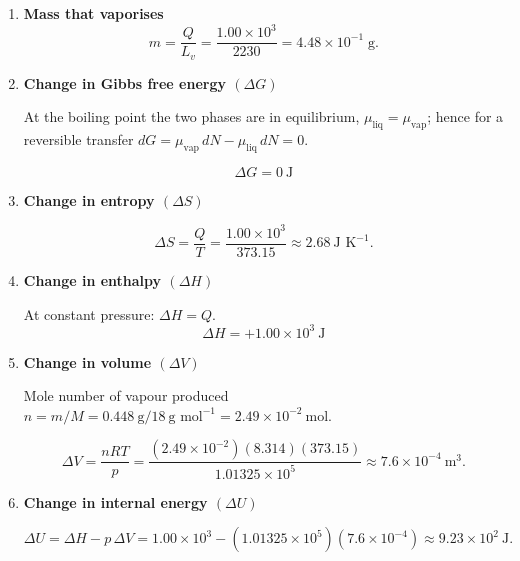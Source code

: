 \documentclass[12pt]{article}
\theoremstyle{definition} %
\theoremstyle{plain} %
\begin{document}
\begin{enumerate}
\item \textbf{Mass that vaporises}
      \[
        m = \frac{Q}{L_v}
            = \frac{1.00\times10^{3}}{2230}
            = 4.48\times10^{-1}\;\text{g}.
      \]

\item \textbf{Change in Gibbs free energy \((\Delta G)\)}

      At the boiling point the two phases are in equilibrium,  
      \(\mu_{\text{liq}} = \mu_{\text{vap}}\); hence for a reversible transfer  
      \(dG = \mu_{\text{vap}}\,dN - \mu_{\text{liq}}\,dN = 0\).

      \[
        \boxed{\;\Delta G = 0\ \text{J}\;}
      \]

\item \textbf{Change in entropy \((\Delta S)\)}

      \[
        \Delta S = \frac{Q}{T}
                 = \frac{1.00\times10^{3}}{373.15}
                 \approx \boxed{2.68\ \text{J K}^{-1}}.
      \]

\item \textbf{Change in enthalpy \((\Delta H)\)}

      At constant pressure: \(\displaystyle \Delta H = Q\).
      \[
        \boxed{\;\Delta H = +1.00\times10^{3}\ \text{J}\;}
      \]

\item \textbf{Change in volume \((\Delta V)\)}

      Mole number of vapour produced  
      \(n = m/M = 0.448\ \text{g}/18\ \text{g mol}^{-1}=2.49\times10^{-2}\ \text{mol}\).

      \[
        \Delta V
        = \frac{nRT}{p}
        = \frac{(2.49\times10^{-2})(8.314)(373.15)}
               {1.01325\times10^{5}}
        \approx \boxed{7.6\times10^{-4}\ \text{m}^{3}}.
      \]

\item \textbf{Change in internal energy \((\Delta U)\)}

      \[
        \Delta U = \Delta H - p\,\Delta V
                 = 1.00\times10^{3}
                   - (1.01325\times10^{5})(7.6\times10^{-4})
                 \approx \boxed{9.23\times10^{2}\ \text{J}}.
      \]
\end{enumerate}
\end{document}
